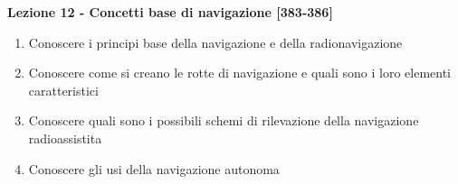\documentclass{article}
\begin{document}
	\begin{center}
	\textbf{Lezione 12 - Concetti base di navigazione [383-386]}
	\begin{enumerate}
	\item Conoscere i principi base della navigazione e della radionavigazione
	\item Conoscere come si creano le rotte di navigazione e quali sono i loro elementi caratteristici
	\item Conoscere quali sono i possibili schemi di rilevazione della navigazione radioassistita
	\item Conoscere gli usi della navigazione autonoma
	\end{enumerate}
	\end{center}
\end{document}

